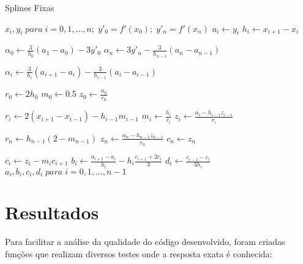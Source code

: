 \documentclass[final,5p]{elsarticle}
\numberwithin{equation}{section}
\begin{document}
        \begin{algorithm}
            \caption{Splines Fixas}\label{alg:splines}
            \begin{algorithmic}
                \Require $x_i,y_i \; para \; i=0,1,\ldots,n; \; y'_0=f'(x_0); \; y'_n=f'(x_n)$
                    \State $a_i \gets y_i$
                \EndFor
                    \State $h_i \gets x_{i+1} - x_i$
                \EndFor

                \State $\alpha_0 \gets \frac{3}{h_0}(a_1-a_0) - 3 y'_0$
                \State $\alpha_n \gets 3 y'_n - \frac{3}{h_{n-1}}(a_n-a_{n-1})$

                    \State $\alpha_i \gets \frac{3}{h_i} (a_{i+1}-a_i) - \frac{3}{h_{i-1}} (a_i-a_{i-1})$
                \EndFor
                
                \State $r_0 \gets 2 h_0$
                \State $m_0 \gets 0.5$
                \State $z_0 \gets \frac{\alpha_0}{r_0}$
                
                    \State $r_i \gets 2 (x_{i+1} - x_{i-1}) - h_{i-1} m_{i-1}$
                    \State $m_i \gets \frac{h_i}{r_i}$
                    \State $z_i \gets \frac{\alpha_i - h_{i-1} z_{i-1}}{r_i}$
                \EndFor
                
                \State $r_n \gets h_{n-1} (2 - m_{n-1})$
                \State $z_n \gets \frac{\alpha_n - h_{n-1} z_{n-1}}{r_n}$
                \State $c_n \gets z_n$
                
                    \State $c_i \gets z_i - m_i c_{i+1}$
                    \State $b_i \gets \frac{a_{i+1} - a_i}{h_i} - h_i \frac{c_{i+1} + 2 c_i}{3}$
                    \State $d_i \gets \frac{c_{i-1} - c_i}{3 h_i}$
                \EndFor
                \State \Return $a_i,b_i,c_i,d_i \; para \; i=0,1,\ldots,n-1$
            \end{algorithmic}
        \end{algorithm}
    
    \section{Resultados}
    
        Para facilitar a análise da qualidade do código desenvolvido, foram criadas funções que realizam diversos testes onde a resposta exata é conhecida:
\end{document}
